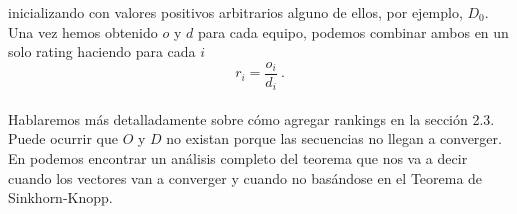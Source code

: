inicializando con valores positivos arbitrarios alguno de ellos, por ejemplo, $D_{0}$.\\

Una vez hemos obtenido $o$ y $d$ para cada equipo, podemos combinar ambos en un solo rating haciendo para cada $i$
\begin{equation}
r_{i}= \dfrac{o_{i}}{d_{i}} \label{ODr} \ .
\end{equation}
\ \\
Hablaremos más detalladamente sobre cómo agregar rankings en la sección 2.3.\\

Puede ocurrir que $O$ y $D$ no existan porque las secuencias no llegan a converger. En \cite[págs 87-91]{libro_rankings} podemos encontrar un análisis completo del teorema que nos va a decir cuando los vectores van a converger y cuando no basándose en el Teorema de Sinkhorn-Knopp.
    
